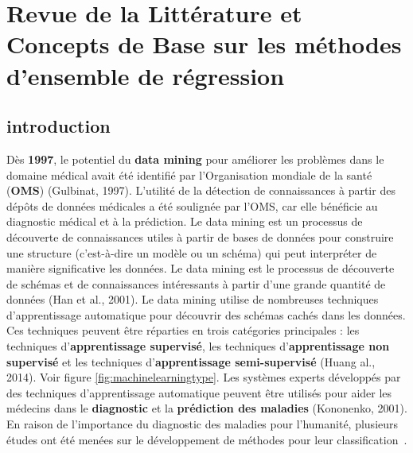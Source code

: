\chapter{Revue de la Littérature et Concepts de Base sur les méthodes d'ensemble de régression}
\section*{introduction}
Dès \textbf{1997}, le potentiel du \textbf{data mining} pour améliorer les problèmes dans le domaine médical avait été identifié par l'Organisation mondiale de la santé (\textbf{OMS}) (Gulbinat, 1997). L'utilité de la détection de connaissances à partir des dépôts de données médicales a été soulignée par l'OMS, car elle bénéficie au diagnostic médical et à la prédiction. Le data mining est un processus de découverte de connaissances utiles à partir de bases de données pour construire une structure (c'est-à-dire un modèle ou un schéma) qui peut interpréter de manière significative les données. Le data mining est le processus de découverte de schémas et de connaissances intéressants à partir d'une grande quantité de données (Han et al., 2001). Le data mining utilise de nombreuses techniques d'apprentissage automatique pour découvrir des schémas cachés dans les données. Ces techniques peuvent être réparties en trois catégories principales : les techniques d'\textbf{apprentissage supervisé}, les techniques d'\textbf{apprentissage non supervisé} et les techniques d'\textbf{apprentissage semi-supervisé} (Huang al., 2014). Voir figure \ref{fig:machinelearningtype}. Les systèmes experts développés par des techniques d'apprentissage automatique peuvent être utilisés pour aider les médecins dans le \textbf{diagnostic} et la \textbf{prédiction des maladies} (Kononenko, 2001). En raison de l'importance du diagnostic des maladies pour l'humanité, plusieurs études ont été menées sur le développement de méthodes pour leur classification~\cite{Analytical2017Meh}.

